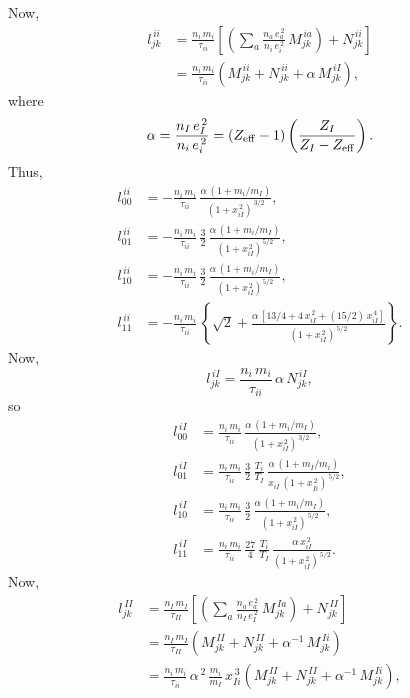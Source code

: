 \documentclass[notitlepage,12pt]{article}
\begin{document}
Now,
\begin{align}
l_{jk}^{\,ii} & = \frac{n_i\,m_i}{\tau_{ii}}\left[\left(\sum_a \frac{n_a\,e_a^{\,2}}{n_i\,e_i^{\,2}}\,M^{\,ia}_{jk}\right) + N^{\,ii}_{jk}\right]\\[0.5ex]
&= \frac{n_i\,m_i}{\tau_{ii}}\left(M^{\,ii}_{jk}+N^{\,ii}_{jk}+\alpha\,M^{\,iI}_{jk}\right),
\end{align}
where 
\begin{equation}
\alpha= \frac{n_I\,e_I^{\,2}}{n_i\,e_i^{\,2}}= (Z_{\rm eff}-1)\left(\frac{Z_I}{Z_I-Z_{\rm eff}}\right).
\end{equation}
Thus,
\begin{align}
l^{\,ii}_{00} &= -\frac{n_i\,m_i}{\tau_{ii}}\,\frac{\alpha\,(1+m_i/m_I)}{(1+x_{iI}^{\,2})^{\,3/2}},\\[0.5ex]
l^{\,ii}_{01}&= -\frac{n_i\,m_i}{\tau_{ii}}\,\frac{3}{2}\,\frac{\alpha\,(1+m_i/m_I)}{(1+x_{iI}^{\,2})^{5/2}},\\[0.5ex]
l^{\,ii}_{10}&= -\frac{n_i\,m_i}{\tau_{ii}}\,\frac{3}{2}\,\frac{\alpha\,(1+m_i/m_I)}{(1+x_{iI}^{\,2})^{5/2}},\\[0.5ex]
l^{\,ii}_{11}& = -\frac{n_i\,m_i}{\tau_{ii}}\,\left\{\sqrt{2}+ \frac{\alpha\,[13/4+4\,x_{iI}^{\,2}+(15/2)\,x_{iI}^{\,4}]}{(1+x_{iI}^{\,2})^{\,5/2}}\right\}.
\end{align}
Now,
\begin{equation}
l_{jk}^{\,iI} = \frac{n_i\,m_i}{\tau_{ii}}\,\alpha\,N^{\,iI}_{jk},
\end{equation}
so 
\begin{align}
l^{\,iI}_{00} &= \frac{n_i\,m_i}{\tau_{ii}}\,\frac{\alpha\,(1+m_i/m_I)}{(1+x_{iI}^{\,2})^{\,3/2}},\\[0.5ex]
l^{\,iI}_{01}&= \frac{n_i\,m_i}{\tau_{ii}}\,\frac{3}{2}\,\frac{T_i}{T_I}\,\frac{\alpha\,(1+m_I/m_i)}{x_{iI}\,(1+x_{Ii}^{\,2})^{\,5/2}},\\[0.5ex]
l^{\,iI}_{10}&= \frac{n_i\,m_i}{\tau_{ii}}\,\frac{3}{2}\,\frac{\alpha\,(1+m_i/m_I)}{(1+x_{iI}^{\,2})^{\,5/2}},\\[0.5ex]
l^{\,iI}_{11}& = \frac{n_i\,m_i}{\tau_{ii}}\,\frac{27}{4}\,\frac{T_i}{T_I}\,\frac{\alpha\,x_{iI}^{\,2}}{(1+x_{iI}^{\,2})^{\,5/2}}.
\end{align}
Now,
\begin{align}
l_{jk}^{\,II} & = \frac{n_I\,m_I}{\tau_{II}}\left[\left(\sum_a \frac{n_a\,e_a^{\,2}}{n_I\,e_I^{\,2}}\,M^{\,Ia}_{jk}\right) + N^{\,II}_{jk}\right]\\[0.5ex]
&=\frac{n_I\,m_I}{\tau_{II}}\left(M^{\,II}_{jk}+N^{\,II}_{jk}+\alpha^{-1}\,M^{\,Ii}_{jk}\right)\nonumber\\[0.5ex]
&= \frac{n_i\,m_i}{\tau_{ii}}\,\alpha^{\,2}\,\frac{m_i}{m_I}\,x_{Ii}^{\,3}\left(M^{\,II}_{jk}+N^{\,II}_{jk}+\alpha^{-1}\,M^{\,Ii}_{jk}\right),
\end{align}
\end{document}
